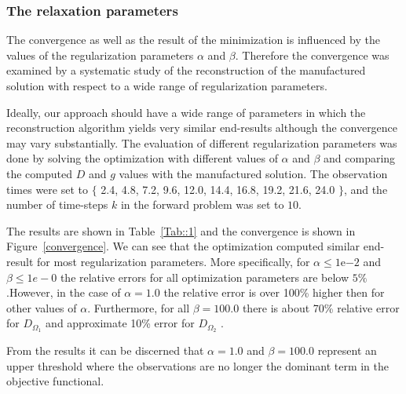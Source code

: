 \documentclass[11pt,a4paper]{article}
\begin{document}
\subsubsection{The relaxation parameters}

The convergence as well as the result of the minimization is influenced by the values of the regularization parameters $\alpha$ and $\beta$. Therefore the convergence was examined by a systematic study of the reconstruction of the manufactured solution with respect to a wide range of regularization parameters. 


Ideally, our approach should have a wide range of parameters in which the reconstruction algorithm yields very similar end-results although the convergence may vary substantially. The evaluation of different regularization parameters was done by solving the optimization with different values of $\alpha$ and $\beta$ and comparing the computed $D$ and $g$ values with the manufactured solution. The observation times were set to $\lbrace$ 2.4, 4.8, 7.2, 9.6, 12.0, 14.4, 16.8, 19.2, 21.6, 24.0 $\rbrace$, and the number of time-steps $k$ in the forward problem was set to $10$. 

The results are shown in Table~\ref{Tab::1} and the convergence is shown in Figure~\ref{convergence}. We can see that the optimization computed similar end-result for most regularization parameters. More specifically, for $\alpha \leq 1\mathrm{e}{-2}$ and $\beta \leq 1e-0$ the relative errors for all optimization parameters are below $5\%$.However, in the case of $ \alpha=1.0$ the relative error is over 100\% higher then for other values of $\alpha$. Furthermore, for all $\beta=100.0$ there is about 70\% relative error for $D_{\Omega_1}$ and approximate 10\% error for $D_{\Omega_2}$ .


From the results it can be discerned that $\alpha =1.0$ and $\beta=100.0$ represent an upper threshold where the observations are no longer the dominant term in the objective functional.  
\end{document}
